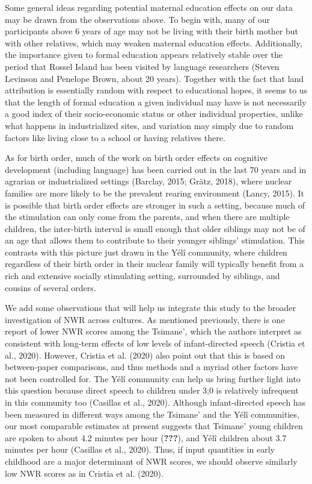 \documentclass[english,,man,floatsintext]{apa6}
\begin{document}
Some general ideas regarding potential maternal education effects on our data may be drawn from the observations above. To begin with, many of our participants above 6 years of age may not be living with their birth mother but with other relatives, which may weaken maternal education effects. Additionally, the importance given to formal education appears relatively stable over the period that Rossel Island has been visited by language researchers (Steven Levinson and Penelope Brown, about 20 years). Together with the fact that land attribution is essentially random with respect to educational hopes, it seems to us that the length of formal education a given individual may have is not necessarily a good index of their socio-economic status or other individual properties, unlike what happens in industrialized sites, and variation may simply due to random factors like living close to a school or having relatives there.

As for birth order, much of the work on birth order effects on cognitive development (including language) has been carried out in the last 70 years and in agrarian or industrialized settings (Barclay, 2015; Grätz, 2018), where nuclear families are more likely to be the prevalent rearing environment (Lancy, 2015). It is possible that birth order effects are stronger in such a setting, because much of the stimulation can only come from the parents, and when there are multiple children, the inter-birth interval is small enough that older siblings may not be of an age that allows them to contribute to their younger siblings' stimulation. This contrasts with this picture just drawn in the Yélî community, where children regardless of their birth order in their nuclear family will typically benefit from a rich and extensive socially stimulating setting, surrounded by siblings, and cousins of several orders.

We add some observations that will help us integrate this study to the broader investigation of NWR across cultures. As mentioned previously, there is one report of lower NWR scores among the Tsimane', which the authors interpret as consistent with long-term effects of low levels of infant-directed speech (Cristia et al., 2020). However, Cristia et al. (2020) also point out that this is based on between-paper comparisons, and thus methods and a myriad other factors have not been controlled for. The Yélî community can help us bring further light into this question because direct speech to children under 3;0 is relatively infrequent in this community too (Casillas et al., 2020). Although infant-directed speech has been measured in different ways among the Tsimane' and the Yélî communities, our most comparable estimates at present suggests that Tsimane' young children are spoken to about 4.2 minutes per hour ({\textbf{???}}), and Yélî children about 3.7 minutes per hour (Casillas et al., 2020). Thus, if input quantities in early childhood are a major determinant of NWR scores, we should observe similarly low NWR scores as in Cristia et al. (2020).
\end{document}

